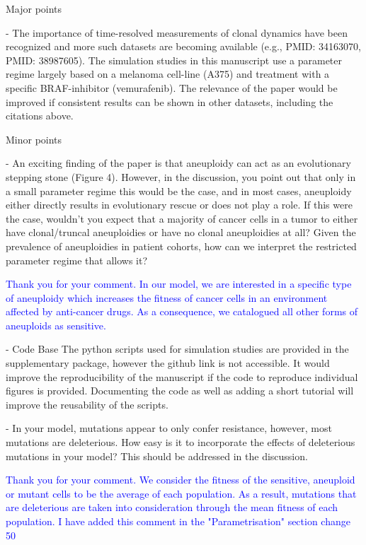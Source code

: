 \documentclass[11pt,a4paper]{article}
\begin{document}
Major points

- The importance of time-resolved measurements of clonal dynamics have been recognized and more such datasets are becoming available (e.g., PMID: 34163070, PMID: 38987605). The simulation studies in this manuscript use a parameter regime largely based on a melanoma cell-line (A375) and treatment with a specific BRAF-inhibitor (vemurafenib). The relevance of the paper would be improved if consistent results can be shown in other datasets, including the citations above.

Minor points

- An exciting finding of the paper is that aneuploidy can act as an evolutionary stepping stone (Figure 4). However, in the discussion, you point out that only in a small parameter regime this would be the case, and in most cases, aneuploidy either directly results in evolutionary rescue or does not play a role. If this were the case, wouldn't you expect that a majority of cancer cells in a tumor to either have clonal/truncal aneuploidies or have no clonal aneuploidies at all? Given the prevalence of aneuploidies in patient cohorts, how can we interpret the restricted parameter regime that allows it?

\textcolor{blue}{Thank you for your comment. In our model, we are interested in a specific type of aneuploidy which increases the fitness of cancer cells in an environment affected by anti-cancer drugs. As a consequence, we catalogued all other forms of aneuploids as sensitive.} 

- Code Base
The python scripts used for simulation studies are provided in the supplementary package, however the github link is not accessible.
It would improve the reproducibility of the manuscript if the code to reproduce individual figures is provided.
Documenting the code as well as adding a short tutorial will improve the reusability of the scripts.

- In your model, mutations appear to only confer resistance, however, most mutations are deleterious. How easy is it to incorporate the effects of deleterious mutations in your model? This should be addressed in the discussion.

\textcolor{blue}{Thank you for your comment. We consider the fitness of the sensitive, aneuploid or mutant cells to be the average of each population. As a result, mutations that are deleterious are taken into consideration through the mean fitness of each population. I have added this comment in the "Parametrisation" section change 50} 
\end{document}
